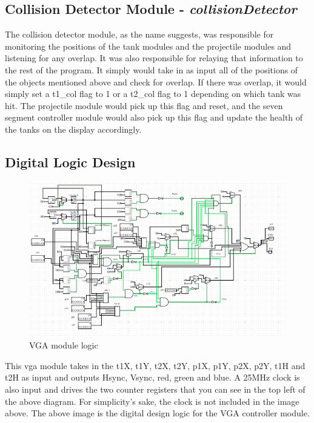 \documentclass{article}
\begin{document}
\subsection*{Collision Detector Module - \textit{collisionDetector} }

The collision detector module, as the name suggests, was responsible for monitoring the positions of the tank modules and the projectile modules and listening for any overlap.  It was also responsible for relaying that information to the rest of the program. It simply would take in as input all of the positions of the objects mentioned above and check for overlap.  If there was overlap, it would simply set a t1\_col flag to 1 or a t2\_col flag to 1 depending on which tank was hit.  The projectile module would pick up this flag and reset, and the seven segment controller module would also pick up this flag and update the health of the tanks on the display accordingly.

\subsection*{Digital Logic Design}


\begin{figure}[H]
	\begin{center}
		\includegraphics[width=1\textwidth]{vgaOut} 
		\caption{VGA module logic}
	\end{center}
\end{figure}

This vga module takes in the t1X, t1Y, t2X, t2Y, p1X, p1Y, p2X, p2Y, t1H and t2H as input and outputs Hsync, Vsync, red, green and blue. A 25MHz clock is also input and drives the two counter registers that you can see in the top left of the above diagram.  For simplicity's sake, the clock is not included in the image above. The above image is the digital design logic for the VGA controller module.
\end{document}
